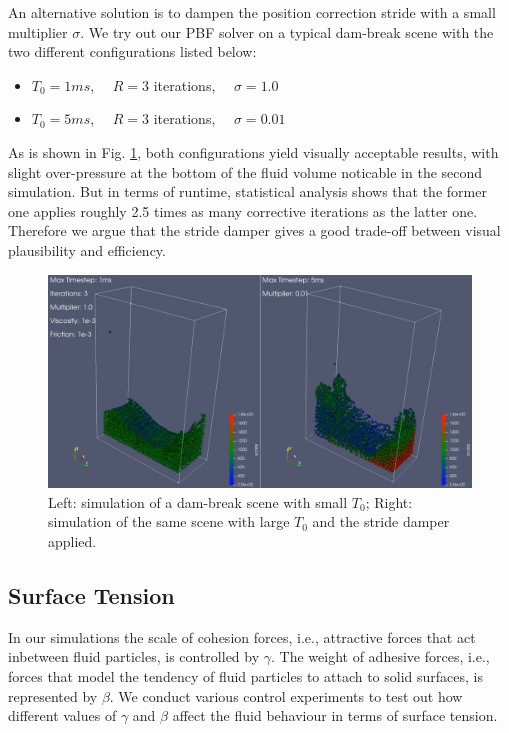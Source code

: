 \documentclass[
	11pt, 
	DIV10,
	ngerman,
	a4paper, 
	oneside, 
	headings=normal, 
	captions=tableheading,
	final, 
	numbers=noenddot
]{scrartcl}
\begin{document}
An alternative solution is to dampen the position correction stride with a small multiplier $ \sigma $. We try out our PBF solver on a typical dam-break scene with the two different configurations listed below:

\begin{itemize}
    \item $ T_{0} = 1ms $, $ \quad R = 3 $ iterations, $ \quad \sigma = 1.0 $
    \item $ T_{0} = 5ms $, $ \quad R = 3 $ iterations, $ \quad \sigma = 0.01 $
\end{itemize}

As is shown in Fig. \ref{fig:strideDamper}, both configurations yield visually acceptable results, with slight over-pressure at the bottom of the fluid volume noticable in the second simulation. But in terms of runtime, statistical analysis shows that the former one applies roughly 2.5 times as many corrective iterations as the latter one. Therefore we argue that the stride damper gives a good trade-off between visual plausibility and efficiency.

\begin{figure}[h]
    \centering
    \includegraphics[width=.6\textwidth]{pics/pbf_stride_damper.png}
    \caption{Left: simulation of a dam-break scene with small $ T_{0} $; Right: simulation of the same scene with large $ T_{0} $ and the stride damper applied.}
    \label{fig:strideDamper}
\end{figure}

\subsection{Surface Tension}

In our simulations the scale of cohesion forces, i.e., attractive forces that act inbetween fluid particles, is controlled by $ \gamma $. The weight of adhesive forces, i.e., forces that model the tendency of fluid particles to attach to solid surfaces, is represented by $ \beta $. We conduct various control experiments to test out how different values of $ \gamma $ and $ \beta $ affect the fluid behaviour in terms of surface tension.
\end{document}
